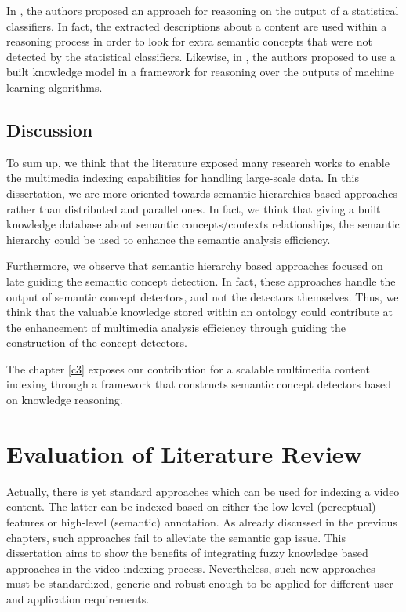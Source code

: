 		In \citep{Dasiopoulou2008,Dasiopoulou2009a}, the authors proposed an approach for 
		reasoning on the output of a statistical classifiers. In fact, the extracted
		descriptions about a content are used within a reasoning process in order to look for 
		extra semantic concepts that were not detected by the statistical classifiers. 
		Likewise, in \citep{Hudelot2010,Bannour2014}, the authors proposed to use a built 
		knowledge model in a framework for reasoning over the outputs of machine learning algorithms. 

		\subsection{Discussion}

		To sum up, we think that the literature exposed many research works to enable the multimedia 
		indexing capabilities for handling large-scale data. In this dissertation, we are more oriented
		towards semantic hierarchies based approaches rather than distributed and parallel ones. 
		In fact, we think that giving a built knowledge database about semantic concepts/contexts 
		relationships, the semantic hierarchy could be used to enhance the semantic analysis efficiency. 
		
		Furthermore, we observe that semantic hierarchy based approaches focused on late guiding 
		the semantic concept detection. In fact, these approaches handle the output of semantic 
		concept detectors, and not the detectors themselves. Thus, we think that the valuable 
		knowledge stored within an ontology could contribute at the enhancement of 
		multimedia analysis efficiency through guiding the construction of the concept detectors. 
		
		The chapter \ref{c3} exposes our contribution for a scalable multimedia content indexing 
		through a framework that constructs semantic concept detectors based on knowledge reasoning.


	\section{Evaluation of Literature Review}

		Actually, there is yet standard approaches which can be used for indexing a
		video content. The latter can be indexed based on either the low-level (perceptual) 
		features or high-level (semantic) annotation. As already discussed in the previous
		chapters, such approaches fail to alleviate the semantic gap issue. This dissertation 
		aims to show the benefits of integrating
		fuzzy knowledge based approaches in the video indexing process. Nevertheless, such new
		approaches must be standardized, generic and robust enough to be applied for different user
		and application requirements.

